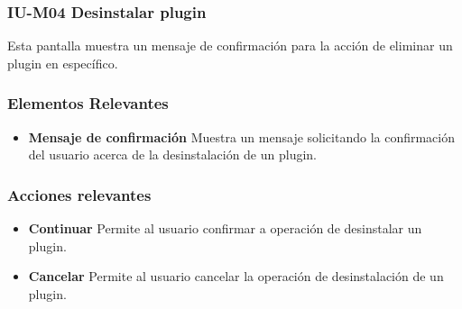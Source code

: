 
\subsubsection{IU-M04 Desinstalar plugin}

 Esta pantalla muestra un mensaje de confirmación para la acción de eliminar un
 plugin en específico.


\subsubsection{Elementos Relevantes}

    \begin{itemize}
    \item {\bf Mensaje de confirmación}
        Muestra un mensaje solicitando la confirmación del usuario acerca de la
        desinstalación de un plugin.
    \end{itemize}

\subsubsection{Acciones relevantes}

    \begin{itemize}
    \item {\bf Continuar}
        Permite al usuario confirmar a operación de desinstalar un plugin.
    \item {\bf Cancelar}
        Permite al usuario cancelar la operación de desinstalación de un plugin.
    \end{itemize}

\clearpage
